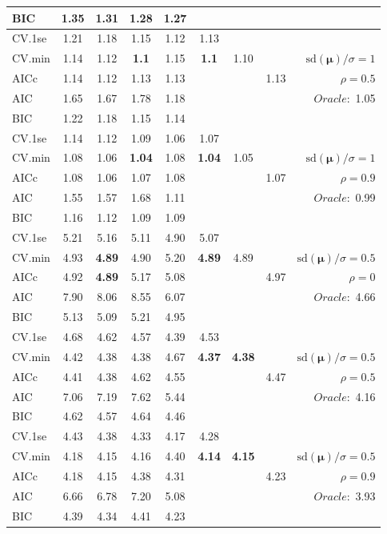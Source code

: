 \begin{table}
\begin{center}
\begin{tabular}{l*{7}{c}|r}
BIC & 1.35 & 1.31 & 1.28 & 1.27 & & & &  \\
 \hline 
CV.1se & 1.21 & 1.18 & 1.15 & 1.12 & 1.13 & & & \\
CV.min & 1.14 & 1.12 & {\bf 1.1} & 1.15 & {\bf 1.1} & 1.10 & & $\mathrm{sd}(\mathbf{\mu})/\sigma=1$ \\
AICc & 1.14 & 1.12 & 1.13 & 1.13 & & & 1.13 &  $\rho=0.5$ \\
AIC & 1.65 & 1.67 & 1.78 & 1.18 & & & &  \multirow{2}{*}{$Oracle: $ 1.05} \\
BIC & 1.22 & 1.18 & 1.15 & 1.14 & & & &  \\
 \hline 
CV.1se & 1.14 & 1.12 & 1.09 & 1.06 & 1.07 & & & \\
CV.min & 1.08 & 1.06 & {\bf 1.04} & 1.08 & {\bf 1.04} & 1.05 & & $\mathrm{sd}(\mathbf{\mu})/\sigma=1$ \\
AICc & 1.08 & 1.06 & 1.07 & 1.08 & & & 1.07 &  $\rho=0.9$ \\
AIC & 1.55 & 1.57 & 1.68 & 1.11 & & & &  \multirow{2}{*}{$Oracle: $ 0.99} \\
BIC & 1.16 & 1.12 & 1.09 & 1.09 & & & &  \\
 \hline 
CV.1se & 5.21 & 5.16 & 5.11 & 4.90 & 5.07 & & & \\
CV.min & 4.93 & {\bf 4.89} & 4.90 & 5.20 & {\bf 4.89} & 4.89 & & $\mathrm{sd}(\mathbf{\mu})/\sigma=0.5$ \\
AICc & 4.92 & {\bf 4.89} & 5.17 & 5.08 & & & 4.97 &  $\rho=0$ \\
AIC & 7.90 & 8.06 & 8.55 & 6.07 & & & &  \multirow{2}{*}{$Oracle: $ 4.66} \\
BIC & 5.13 & 5.09 & 5.21 & 4.95 & & & &  \\
 \hline 
CV.1se & 4.68 & 4.62 & 4.57 & 4.39 & 4.53 & & & \\
CV.min & 4.42 & 4.38 & 4.38 & 4.67 & {\bf 4.37} & {\bf 4.38} & & $\mathrm{sd}(\mathbf{\mu})/\sigma=0.5$ \\
AICc & 4.41 & 4.38 & 4.62 & 4.55 & & & 4.47 &  $\rho=0.5$ \\
AIC & 7.06 & 7.19 & 7.62 & 5.44 & & & &  \multirow{2}{*}{$Oracle: $ 4.16} \\
BIC & 4.62 & 4.57 & 4.64 & 4.46 & & & &  \\
 \hline 
CV.1se & 4.43 & 4.38 & 4.33 & 4.17 & 4.28 & & & \\
CV.min & 4.18 & 4.15 & 4.16 & 4.40 & {\bf 4.14} & {\bf 4.15} & & $\mathrm{sd}(\mathbf{\mu})/\sigma=0.5$ \\
AICc & 4.18 & 4.15 & 4.38 & 4.31 & & & 4.23 &  $\rho=0.9$ \\
AIC & 6.66 & 6.78 & 7.20 & 5.08 & & & &  \multirow{2}{*}{$Oracle: $ 3.93} \\
BIC & 4.39 & 4.34 & 4.41 & 4.23 & & & &  \\
 \hline 
\end{tabular}
\end{center}
\vspace{-1cm}
\end{table}





